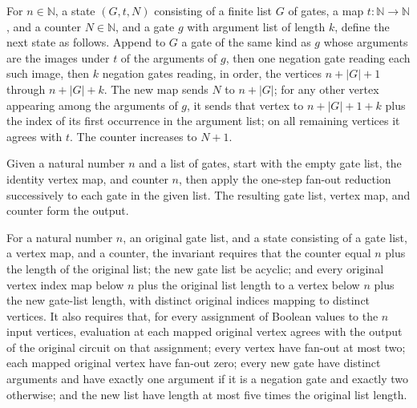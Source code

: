 \begin{definition}
\label{BoolCircuit.nnStep}
\leanok
{}
For $n\in\mathbb N$, a state $(G,t,N)$ consisting of a finite list $G$ of gates, a map
$t\colon\mathbb N\to\mathbb N$, and a counter $N\in\mathbb N$, and a gate $g$ with
argument list of length $k$, define the next state as follows. Append to $G$ a gate of
the same kind as $g$ whose arguments are the images under $t$ of the arguments of $g$,
then one negation gate reading each such image, then $k$ negation gates reading, in
order, the vertices $n+|G|+1$ through $n+|G|+k$. The new map sends $N$ to $n+|G|$; for
any other vertex appearing among the arguments of $g$, it sends that vertex to
$n+|G|+1+k$ plus the index of its first occurrence in the argument list; on all
remaining vertices it agrees with $t$. The counter increases to $N+1$.
\end{definition}

\begin{definition}
\label{BoolCircuit.nnGates}
\leanok
{}
Given a natural number $n$ and a list of gates, start with the empty gate list, the
identity vertex map, and counter $n$, then apply the one-step fan-out reduction
successively to each gate in the given list. The resulting gate list, vertex map, and
counter form the output.
\end{definition}

\begin{definition}
\label{BoolCircuit.NNInv}
\leanok
{}
For a natural number $n$, an original gate list, and a state consisting of a gate list,
a vertex map, and a counter, the invariant requires that the counter equal $n$ plus the
length of the original list; the new gate list be acyclic; and every original vertex
index map below $n$ plus the original list length to a vertex below $n$ plus the new
gate-list length, with distinct original indices mapping to distinct vertices. It also
requires that, for every assignment of Boolean values to the $n$ input vertices,
evaluation at each mapped original vertex agrees with the output of the original circuit
on that assignment; every vertex have fan-out at most two; each mapped original vertex
have fan-out zero; every new gate have distinct arguments and have exactly one argument
if it is a negation gate and exactly two otherwise; and the new list have length at most
five times the original list length.
\end{definition}


